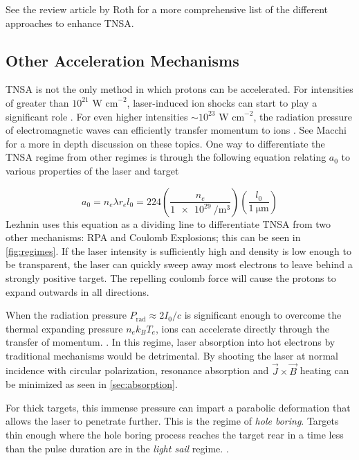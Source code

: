 See the review article by Roth \cite{Roth_2016_CERN_TNSA} for a more comprehensive list of the different approaches to enhance TNSA.

\subsection{Other Acceleration Mechanisms}
\gls{TNSA} is not the only method in which protons can be accelerated. For intensities of greater than $10^{21} \text{ W cm}^{-2}$, laser-induced ion shocks can start to play a significant role \cite{Fuchs_2005_Nat}. For even higher intensities $\sim 10^{23} \text{ W cm}^{-2}$, the radiation pressure of electromagnetic waves can efficiently transfer momentum to ions \cite{Fuchs_2005_Nat}. See Macchi \cite{Macchi_2013_RevModPhys} for a more in depth discussion on these topics. One way to differentiate the \gls{TNSA} regime from other regimes is through the following equation relating $a_0$ to various properties of the laser and target

\begin{equation}
	a_0 = n_e \lambda r_e l_0 = 224 \left(\frac{n_e}{\SI{1e29}{\per \meter \cubed}}\right) \left(\frac{l_0}{\SI{1}{\micro \meter}} \right) \label{eq:acc_regime}
\end{equation}
Lezhnin \cite{Lezhnin_2015_PoP} uses this equation as a dividing line to differentiate \gls{TNSA} from two other mechanisms: \gls{RPA} and Coulomb Explosions; this can be seen in \cref{fig:regimes}. If the laser intensity is sufficiently high and density is low enough to be transparent, the laser can quickly sweep away most electrons to leave behind a strongly positive target. The repelling coulomb force will cause the protons to expand outwards in all directions.

When the radiation pressure $P_\text{rad} \approx 2 I_0 / c$ is significant enough to overcome the thermal expanding pressure $n_e k_B T_e$, ions can accelerate directly through the transfer of momentum. \cite{Macchi_2013_RevModPhys}. In this regime, laser absorption into hot electrons by traditional mechanisms would be detrimental. By shooting the laser at normal incidence with circular polarization, resonance absorption and $\vec{J} \times \vec{B}$ heating can be minimized as seen in \cref{sec:absorption}.

For thick targets, this immense pressure can impart a parabolic deformation that allows the laser to penetrate further. This is the regime of \emph{hole boring}. Targets thin enough where the hole boring process reaches the target rear in a time less than the pulse duration are in the \emph{light sail} regime. \cite{Macchi_2013_RevModPhys}. 

